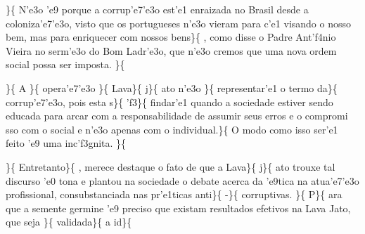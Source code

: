  \ltrch{}  \par \}\{\rtlch{}
 \ltrch{}  N'e3o 'e9 porque a
corrup'e7'e3o est'e1 enraizada no Brasil desde a coloniza'e7'e3o, visto
que os portugueses n'e3o vieram para c'e1 visando o nosso bem, mas para
enriquecer com nossos bens\}\{\rtlch{}  \ltrch{}
 , como disse o Padre Ant'f4nio Vieira no
serm'e3o do Bom Ladr'e3o, que n'e3o cremos que uma nova ordem social
possa ser imposta. \}\{ \rtlch{}  \ltrch{}
 \par \}\{\rtlch{}  \ltrch{}
 A \}\{\rtlch{}  \ltrch{}
 opera'e7'e3o \}\{\rtlch{} 
\ltrch{}  Lava\}\{\rtlch{}  \ltrch{}
 j\}\{ \rtlch{}  \ltrch{}
 ato n'e3o \}\{\rtlch{} 
\ltrch{}  representar'e1 o termo da\}\{\rtlch{}
 \ltrch{}  corrup'e7'e3o, pois
esta s\}\{\rtlch{}  \ltrch{} 
'f3\}\{\rtlch{}  \ltrch{} 
findar'e1 quando a sociedade estiver sendo educada para arcar com a
responsabilidade de assumir seus erros e o compromi sso com o social e
n'e3o apenas com o individual.\}\{\rtlch{}  \ltrch{}
 O modo como isso ser'e1 feito 'e9 uma
inc'f3gnita. \}\{\rtlch{}  \ltrch{}
 \par \}\{\rtlch{}  \ltrch{}
 Entretanto\}\{\rtlch{} 
\ltrch{}  , merece destaque o fato de
que a Lava\}\{\rtlch{}  \ltrch{} 
j\}\{\rtlch{}  \ltrch{}  ato
trouxe tal discurso 'e0 tona e plantou na sociedade o debate acerca da
'e9tica na atua'e7'e3o profissional, consubstanciada nas pr'e1ticas
anti\}\{\rtlch{}  \ltrch{}  -\}\{\rtlch{}
 \ltrch{}  corruptivas.
\}\{\rtlch{}  \ltrch{} 
P\}\{\rtlch{}  \ltrch{}  ara
que a semente germine 'e9 preciso que existam resultados efetivos na
Lava Jato, que seja \}\{\rtlch{}  \ltrch{} 
validada\}\{\rtlch{}  \ltrch{}
 a id\}\{\rtlch{}  \ltrch{}
